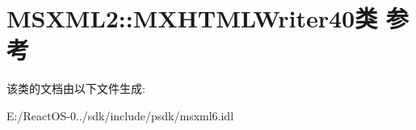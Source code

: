 \hypertarget{class_m_s_x_m_l2_1_1_m_x_h_t_m_l_writer40}{}\section{M\+S\+X\+M\+L2\+:\+:M\+X\+H\+T\+M\+L\+Writer40类 参考}
\label{class_m_s_x_m_l2_1_1_m_x_h_t_m_l_writer40}


该类的文档由以下文件生成\+:\begin{DoxyCompactItemize}
\item 
E\+:/\+React\+O\+S-\/0../sdk/include/psdk/msxml6.\+idl\end{DoxyCompactItemize}
